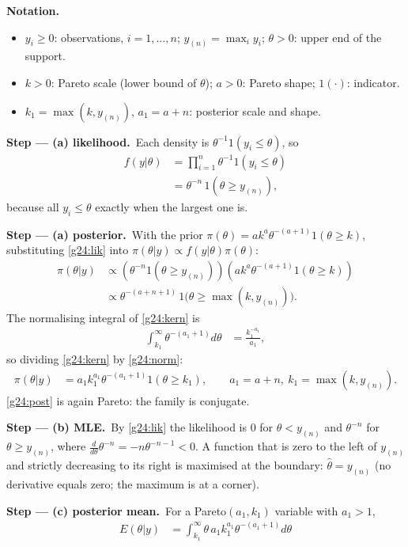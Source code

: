 \documentclass[11pt,a4paper]{article}
\newenvironment{notacao}{\par\smallskip\noindent\textbf{Notation.}\begin{itemize}[leftmargin=1.4em,topsep=1pt,itemsep=0pt]\small}{\end{itemize}}
\newcommand{\passo}[2]{\par\smallskip\noindent\textbf{Step --- #1.}~#2}
\begin{document}
\begin{sol}
\begin{notacao}
\item $y_i\ge0$: observations, $i=1,\ldots,n$; $y_{(n)}=\max_i y_i$; $\theta>0$: upper end of the support.
\item $k>0$: Pareto scale (lower bound of $\theta$); $a>0$: Pareto shape; $1(\cdot)$: indicator.
\item $k_1=\max(k,y_{(n)})$, $a_1=a+n$: posterior scale and shape.
\end{notacao}
\passo{(a) likelihood}{Each density is $\theta^{-1}1(y_i\le\theta)$, so
\begin{align}
f(y|\theta)&=\prod_{i=1}^n\theta^{-1}1(y_i\le\theta)\label{g24:l1}\\
&=\theta^{-n}\,1(\theta\ge y_{(n)}),\label{g24:lik}
\end{align}
because all $y_i\le\theta$ exactly when the largest one is.}
\passo{(a) posterior}{With the prior $\pi(\theta)=ak^a\theta^{-(a+1)}1(\theta\ge k)$, substituting \eqref{g24:lik} into $\pi(\theta|y)\propto f(y|\theta)\pi(\theta)$:
\begin{align}
\pi(\theta|y)&\propto\left(\theta^{-n}1(\theta\ge y_{(n)})\right)\left(ak^a\theta^{-(a+1)}1(\theta\ge k)\right)\label{g24:p1}\\
&\propto\theta^{-(a+n+1)}\,1\big(\theta\ge\max(k,y_{(n)})\big).\label{g24:kern}
\end{align}
The normalising integral of \eqref{g24:kern} is
\begin{align}
\int_{k_1}^\infty\theta^{-(a_1+1)}d\theta&=\frac{k_1^{-a_1}}{a_1},\label{g24:norm}
\end{align}
so dividing \eqref{g24:kern} by \eqref{g24:norm}:
\begin{align}
\pi(\theta|y)&=a_1k_1^{a_1}\theta^{-(a_1+1)}1(\theta\ge k_1),\qquad a_1=a+n,\ k_1=\max(k,y_{(n)}).\label{g24:post}
\end{align}
\eqref{g24:post} is again Pareto: the family is conjugate.}
\passo{(b) MLE}{By \eqref{g24:lik} the likelihood is $0$ for $\theta<y_{(n)}$ and $\theta^{-n}$ for $\theta\ge y_{(n)}$, where $\frac{d}{d\theta}\theta^{-n}=-n\theta^{-n-1}<0$. A function that is zero to the left of $y_{(n)}$ and strictly decreasing to its right is maximised at the boundary: $\hat\theta=y_{(n)}$ (no derivative equals zero; the maximum is at a corner).}
\passo{(c) posterior mean}{For a Pareto$(a_1,k_1)$ variable with $a_1>1$,
\begin{align}
E(\theta|y)&=\int_{k_1}^\infty\theta\,a_1k_1^{a_1}\theta^{-(a_1+1)}d\theta\label{g24:m1}\\

\end{align}}
\end{sol}
\end{document}
